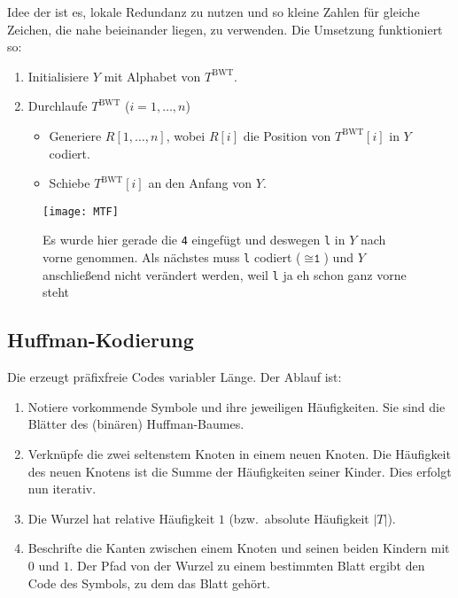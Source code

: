 Idee der  ist es, lokale Redundanz zu nutzen und so kleine Zahlen für gleiche Zeichen, die nahe beieinander liegen, zu verwenden. Die Umsetzung funktioniert so:

\begin{enumerate}
  \item Initialisiere \( Y \) mit Alphabet von \( T^{\text{BWT}} \).
  \item Durchlaufe \( T^{\text{BWT}} \) (\( i = 1,\dots,n \))
  \begin{itemize}
    \item Generiere \( R[1,\dots,n] \), wobei \( R[i] \) die Position von \( T^{\text{BWT}}[i] \) in \( Y \) codiert.
    \item Schiebe \( T^{\text{BWT}}[i] \) an den Anfang von \( Y \).
  \end{itemize}
\end{enumerate}

\begin{figure}[H]
  \texttt{[image: MTF]}
  \caption{Es wurde hier gerade die \texttt{4} eingefügt und deswegen \texttt{l} in \( Y \) nach vorne genommen. Als nächstes muss \texttt{l} codiert (\( \cong \texttt{1} \)) und \( Y \) anschließend nicht verändert werden, weil \texttt{l} ja eh schon ganz vorne steht}
\end{figure}

\clearpage

\subsection{Huffman-Kodierung}

Die  erzeugt präfixfreie Codes variabler Länge. Der Ablauf ist:

\begin{enumerate}
  \item Notiere vorkommende Symbole und ihre jeweiligen Häufigkeiten. Sie sind die Blätter des (binären) Huffman-Baumes.
  \item Verknüpfe die zwei seltenstem Knoten in einem neuen Knoten. Die Häufigkeit des neuen Knotens ist die Summe der Häufigkeiten seiner Kinder. Dies erfolgt nun iterativ.
  \item Die Wurzel hat relative Häufigkeit \( 1 \) (bzw.\ absolute Häufigkeit \( \left\vert T \right\vert \)).
  \item Beschrifte die Kanten zwischen einem Knoten und seinen beiden Kindern mit \( 0 \) und \( 1 \). Der Pfad von der Wurzel zu einem bestimmten Blatt ergibt den Code des Symbols, zu dem das Blatt gehört.
\end{enumerate}

